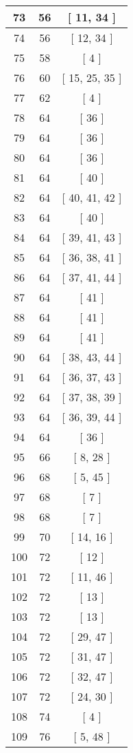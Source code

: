 \begin{center}
\begin{longtable}[H]{|| c c c ||}
\hline
73 & 56 & [ 11, 34 ] \\ 
\hline
74 & 56 & [ 12, 34 ] \\ 
\hline
75 & 58 & [ 4 ] \\ 
\hline
76 & 60 & [ 15, 25, 35 ] \\ 
\hline
77 & 62 & [ 4 ] \\ 
\hline
78 & 64 & [ 36 ] \\ 
\hline
79 & 64 & [ 36 ] \\ 
\hline
80 & 64 & [ 36 ] \\ 
\hline
81 & 64 & [ 40 ] \\ 
\hline
82 & 64 & [ 40, 41, 42 ] \\ 
\hline
83 & 64 & [ 40 ] \\ 
\hline
84 & 64 & [ 39, 41, 43 ] \\ 
\hline
85 & 64 & [ 36, 38, 41 ] \\ 
\hline
86 & 64 & [ 37, 41, 44 ] \\ 
\hline
87 & 64 & [ 41 ] \\ 
\hline
88 & 64 & [ 41 ] \\ 
\hline
89 & 64 & [ 41 ] \\ 
\hline
90 & 64 & [ 38, 43, 44 ] \\ 
\hline
91 & 64 & [ 36, 37, 43 ] \\ 
\hline
92 & 64 & [ 37, 38, 39 ] \\ 
\hline
93 & 64 & [ 36, 39, 44 ] \\ 
\hline
94 & 64 & [ 36 ] \\ 
\hline
95 & 66 & [ 8, 28 ] \\ 
\hline
96 & 68 & [ 5, 45 ] \\ 
\hline
97 & 68 & [ 7 ] \\ 
\hline
98 & 68 & [ 7 ] \\ 
\hline
99 & 70 & [ 14, 16 ] \\ 
\hline
100 & 72 & [ 12 ] \\ 
\hline
101 & 72 & [ 11, 46 ] \\ 
\hline
102 & 72 & [ 13 ] \\ 
\hline
103 & 72 & [ 13 ] \\ 
\hline
104 & 72 & [ 29, 47 ] \\ 
\hline
105 & 72 & [ 31, 47 ] \\ 
\hline
106 & 72 & [ 32, 47 ] \\ 
\hline
107 & 72 & [ 24, 30 ] \\ 
\hline
108 & 74 & [ 4 ] \\ 
\hline
109 & 76 & [ 5, 48 ] \\ 

\end{longtable}
\end{center}
